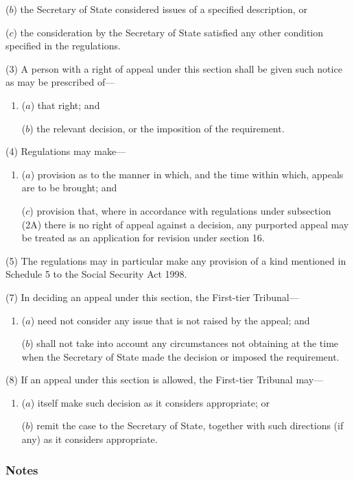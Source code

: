 \documentclass[a4paper]{article}
\newcommand\amendment[1]{\subsubsection*{Notes}{\itshape\frenchspacing\footnotesize #1 \par}}
\begin{document}
{\begin{enumerate}
($b$) the Secretary of State considered issues of a specified description, or

($c$) the consideration by the Secretary of State satisfied any other condition specified in the regulations.
\end{enumerate}

(3) A person with a right of appeal under this section shall be given such notice as may be prescribed of---
\begin{enumerate}\item[]
($a$) that right; and

($b$) the relevant decision, or the imposition of the requirement.
\end{enumerate}

(4) Regulations may make---
\begin{enumerate}\item[]
($a$) provision as to the manner in which, and the time within which, appeals are to be brought; and

($c$) provision that, where in accordance with regulations under subsection (2A) there is no right of appeal against a decision, any purported appeal may be treated as an application for revision under section 16.
\end{enumerate}

(5)
The regulations may in particular make any provision of a kind mentioned in Schedule 5 to the Social Security Act 1998.

(7) In deciding an appeal under this section, the First-tier Tribunal---
\begin{enumerate}\item[]
($a$) need not consider any issue that is not raised by the appeal; and

($b$) shall not take into account any circumstances not obtaining at the time when the Secretary of State made the decision or imposed the requirement.
\end{enumerate}

(8) If an appeal under this section is allowed, the First-tier Tribunal may---
\begin{enumerate}\item[]
($a$) itself make such decision as it considers appropriate; or

($b$) remit the case to the Secretary of State, together with such directions (if any) as it considers appropriate.
\end{enumerate}


\amendment{

}}
\end{document}
